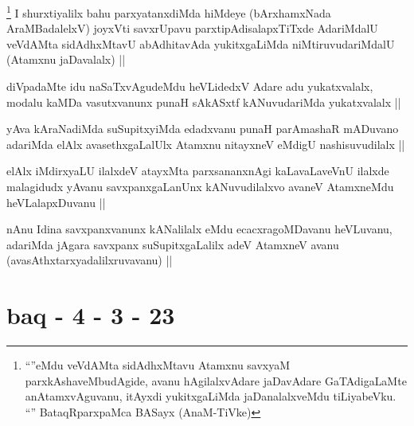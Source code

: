 \begin{artha}
\footnote{``\stext''eMdu veVdAMta sidAdhxMtavu Atamxnu savxyaM parxkAshaveMbudAgide, avanu hAgilalxvAdare jaDavAdare GaTAdigaLaMte anAtamxvAguvanu, itAyxdi yukitxgaLiMda jaDanalalxveMdu tiLiyabeVku. ``\stext'' BataqRparxpaMca BASayx (AnaM-TiVke)}
I shurxtiyalilx bahu parxyatanxdiMda hiMdeye (bArxhamxNada AraMBadalelxV) joyxVti savxrUpavu parxtipAdisalapxTiTxde AdariMdalU veVdAMta sidAdhxMtavU abAdhitavAda yukitxgaLiMda niMtiruvudariMdalU (Atamxnu jaDavalalx) ||
\end{artha}


\begin{artha}
diVpadaMte idu naSaTxvAgudeMdu heVLidedxV Adare adu yukatxvalalx, modalu kaMDa vasutxvanunx punaH sAkASxtf kANuvudariMda yukatxvalalx ||
\end{artha}


\begin{artha}
yAva kAraNadiMda suSupitxyiMda edadxvanu punaH parAmashaR mADuvano adariMda elAlx avasethxgaLalUlx Atamxnu nitayxneV eMdigU nashisuvudilalx ||
\end{artha}


\begin{artha}
elAlx iMdirxyaLU ilalxdeV atayxMta parxsananxnAgi kaLavaLaveVnU ilalxde malagidudx yAvanu savxpanxgaLanUnx kANuvudilalxvo avaneV AtamxneMdu heVLalapxDuvanu ||
\end{artha}


\begin{artha}
nAnu Idina savxpanxvanunx kANalilalx eMdu ecacxragoMDavanu heVLuvanu, adariMda jAgara savxpanx suSupitxgaLalilx adeV AtamxneV avanu (avasAthxtarxyadalilxruvavanu) ||
\end{artha}

\section*{baq - 4 - 3 - 23}

\stext


